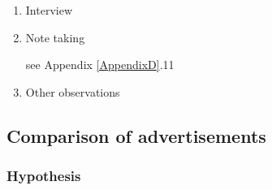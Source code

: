 \begin{enumerate}
\item Interview





\item Note taking


see Appendix \ref{AppendixD}.11


\item Other observations

\end{enumerate}



\subsection{Comparison of advertisements}

\subsubsection{Hypothesis}


